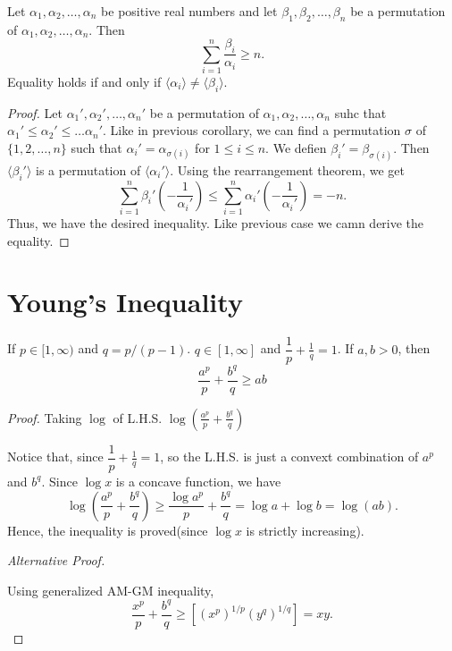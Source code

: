 \begin{corollary}
  Let $\alpha_1, \alpha_2, \ldots, \alpha_n$ be positive real numbers and let $\beta_1, \beta_2, \ldots, \beta_n$ be a permutation
  of $\alpha_1, \alpha_2, \ldots, \alpha_n$. Then $$\sum_{i=1}^n\frac{\beta_i}{\alpha_i}\geq n.$$
  Equality holds if and only if $\langle\alpha_i\rangle\neq\langle\beta_i\rangle$.
\end{corollary}
\begin{proof}
  Let $\alpha_1', \alpha_2', \ldots, \alpha_n'$ be a permutation of $\alpha_1, \alpha_2, \ldots, \alpha_n$ suhc that
  $\alpha_1'\leq\alpha_2'\leq\ldots\alpha_n'$. Like in previous corollary, we can find a permutation $\sigma$ of $\{1,2,\ldots,
  n\}$ such that $\alpha_i' = \alpha_{\sigma(i)}$ for $1\leq i\leq n$. We defien $\beta_i' = \beta_{\sigma(i)}$. Then
  $\langle\beta_i'\rangle$ is a permutation of $\langle\alpha_i'\rangle$. Using the rearrangement theorem, we get
  $$\sum_{i=1}^n\beta_i'\left(-\frac{1}{\alpha_i'}\right)\leq\sum_{i=1}^n\alpha_i'\left(-\frac{1}{\alpha_i'}\right) = -n.$$
  Thus, we have the desired inequality. Like previous case we camn derive the equality.
\end{proof}

\section{Young's Inequality}
\begin{theorem}
  If $p\in [1,\infty)$ and $q = p/(p - 1)$. $q\in [1, \infty]$ and $\dfrac{1}{p} + \frac{1}{q} = 1$. If $a, b > 0$,
    then
    \begin{equation}
      \frac{a^p}{p} + \frac{b^q}{q}\geq ab
    \end{equation}
\end{theorem}

\begin{proof}
  Taking $\log$ of L.H.S. $\log\left(\frac{a^p}{p} + \frac{b^q}{q}\right)$

  Notice that, since $\dfrac{1}{p} + \frac{1}{q} = 1$, so the L.H.S. is just a convext combination of $a^p$ and $b^q$. Since $\log
  x$ is a concave function, we have
  $$\log\left(\frac{a^p}{p} + \frac{b^q}{q}\right)\geq \dfrac{\log a^p}{p} + \dfrac{b^q}{q} = \log a + \log b = \log(ab).$$
  Hence, the inequality is proved(since $\log x$ is strictly increasing).

  {\it Alternative Proof.}

  Using generalized AM-GM inequality, $$\dfrac{x^p}{p} + \frac{b^q}{q}\geq \left[(x^p)^{1/p}(y^q)^{1/q}\right] = xy.$$
\end{proof}

